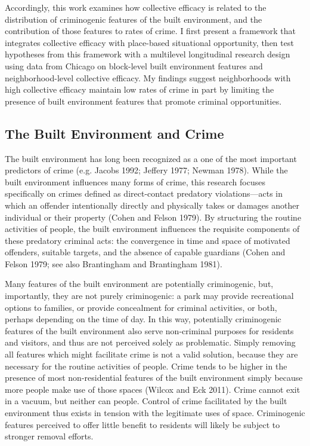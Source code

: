 \documentclass [11pt, proquest] {uwthesis}[2015/03/03]
\begin{document}
Accordingly, this work examines how collective efficacy is related to the distribution of criminogenic features of the built environment, and the contribution of those features to rates of crime. I first present a framework that integrates collective efficacy with place-based situational opportunity, then test hypotheses from this framework with a multilevel longitudinal research design using data from Chicago on block-level built environment features and neighborhood-level collective efficacy. My findings suggest neighborhoods with high collective efficacy maintain low rates of crime in part by limiting the presence of built environment features that promote criminal opportunities.

\hypertarget{the-built-environment-and-crime}{%
\subsection{The Built Environment and Crime}\label{the-built-environment-and-crime}}

The built environment has long been recognized as a one of the most important predictors of crime (e.g. Jacobs 1992; Jeffery 1977; Newman 1978). While the built environment influences many forms of crime, this research focuses specifically on crimes defined as direct-contact predatory violations---acts in which an offender intentionally directly and physically takes or damages another individual or their property (Cohen and Felson 1979). By structuring the routine activities of people, the built environment influences the requisite components of these predatory criminal acts: the convergence in time and space of motivated offenders, suitable targets, and the absence of capable guardians (Cohen and Felson 1979; see also Brantingham and Brantingham 1981).

Many features of the built environment are potentially criminogenic, but, importantly, they are not purely criminogenic: a park may provide recreational options to families, or provide concealment for criminal activities, or both, perhaps depending on the time of day. In this way, potentially criminogenic features of the built environment also serve non-criminal purposes for residents and visitors, and thus are not perceived solely as problematic. Simply removing all features which might facilitate crime is not a valid solution, because they are necessary for the routine activities of people. Crime tends to be higher in the presence of most non-residential features of the built environment simply because more people make use of those spaces (Wilcox and Eck 2011). Crime cannot exit in a vacuum, but neither can people. Control of crime facilitated by the built environment thus exists in tension with the legitimate uses of space. Criminogenic features perceived to offer little benefit to residents will likely be subject to stronger removal efforts.
\end{document}
